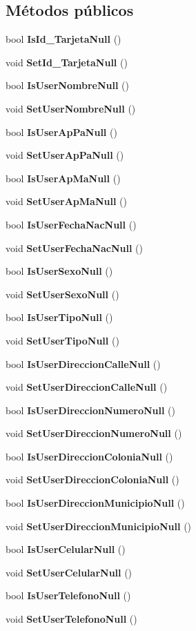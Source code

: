 \subsection*{Métodos públicos}
\begin{DoxyCompactItemize}
\item 
bool {\bf Is\-Id\-\_\-\-Tarjeta\-Null} ()
\item 
void {\bf Set\-Id\-\_\-\-Tarjeta\-Null} ()
\item 
bool {\bf Is\-User\-Nombre\-Null} ()
\item 
void {\bf Set\-User\-Nombre\-Null} ()
\item 
bool {\bf Is\-User\-Ap\-Pa\-Null} ()
\item 
void {\bf Set\-User\-Ap\-Pa\-Null} ()
\item 
bool {\bf Is\-User\-Ap\-Ma\-Null} ()
\item 
void {\bf Set\-User\-Ap\-Ma\-Null} ()
\item 
bool {\bf Is\-User\-Fecha\-Nac\-Null} ()
\item 
void {\bf Set\-User\-Fecha\-Nac\-Null} ()
\item 
bool {\bf Is\-User\-Sexo\-Null} ()
\item 
void {\bf Set\-User\-Sexo\-Null} ()
\item 
bool {\bf Is\-User\-Tipo\-Null} ()
\item 
void {\bf Set\-User\-Tipo\-Null} ()
\item 
bool {\bf Is\-User\-Direccion\-Calle\-Null} ()
\item 
void {\bf Set\-User\-Direccion\-Calle\-Null} ()
\item 
bool {\bf Is\-User\-Direccion\-Numero\-Null} ()
\item 
void {\bf Set\-User\-Direccion\-Numero\-Null} ()
\item 
bool {\bf Is\-User\-Direccion\-Colonia\-Null} ()
\item 
void {\bf Set\-User\-Direccion\-Colonia\-Null} ()
\item 
bool {\bf Is\-User\-Direccion\-Municipio\-Null} ()
\item 
void {\bf Set\-User\-Direccion\-Municipio\-Null} ()
\item 
bool {\bf Is\-User\-Celular\-Null} ()
\item 
void {\bf Set\-User\-Celular\-Null} ()
\item 
bool {\bf Is\-User\-Telefono\-Null} ()
\item 
void {\bf Set\-User\-Telefono\-Null} ()
\item 

\end{DoxyCompactItemize}
